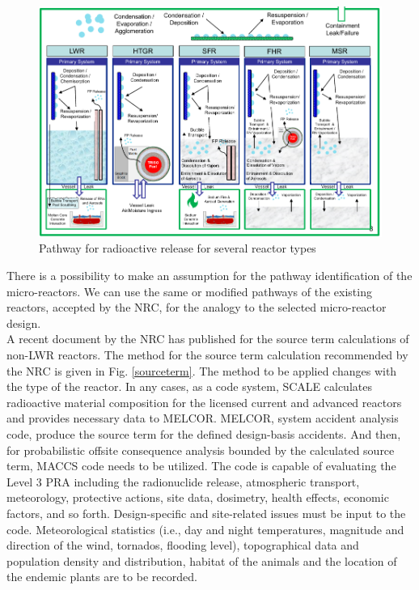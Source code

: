 \begin{figure}[hbtp]
\centering
\includegraphics[scale=0.6]{Figs/pathway.jpeg}
\caption{Pathway for radioactive release for several reactor types}
\label{pathway}
\end{figure}

There is a possibility to make an assumption for the pathway identification of the micro-reactors. We can use the same or modified pathways of the existing reactors, accepted by the NRC, for the analogy to the selected micro-reactor design. \\

A recent document by the NRC \cite{nrc_staff_nrc_2019} has published for the source term calculations of non-LWR reactors.
The method for the source term calculation recommended by the NRC is given in Fig. \ref{sourceterm}. The method to be applied changes with the type of the reactor. In any cases, as a code system, SCALE calculates radioactive material composition for the licensed current and advanced reactors and provides necessary data to MELCOR. MELCOR, system accident analysis code, produce the source term for the defined design-basis accidents. And then, for probabilistic offsite consequence analysis bounded by the calculated source term, MACCS code needs to be utilized. The code is capable of evaluating the Level 3 \gls{PRA} including the radionuclide release, atmospheric transport, meteorology, protective actions, site data, dosimetry, health effects, economic factors, and so forth. Design-specific and site-related issues must be input to the code.  Meteorological statistics (i.e., day and night temperatures, magnitude and direction of the wind, tornados, flooding level), topographical data and population density and distribution, habitat of the animals and the location of the endemic plants are to be recorded. \\

